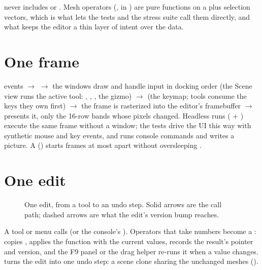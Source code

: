  never includes  or . Mesh operators (, in
) are pure functions on a  plus selection vectors, which is what lets the
tests and the stress suite call them directly, and what keeps the editor a thin layer of intent over the data.

\section{One frame}
 events $\to$  $\to$ the windows draw and handle input in docking order (the Scene
view runs the active tool: , , , the gizmo) $\to$
 (the keymap; tools consume the keys they own first) $\to$ the frame is rasterized into the
editor's framebuffer $\to$  presents it, only the 16-row bands whose pixels changed. Headless runs
( + ) execute the same frame without a window; the tests drive the UI this
way with synthetic mouse and key events, and  runs console commands and writes a
picture. A  () starts frames at most  apart without oversleeping
\cite{Gregory2018vol1}.

\section{One edit}
\begin{figure}[H]
  \centering
  \resizebox{\textwidth}{!}{}
  \caption{One edit, from a tool to an undo step. Solid arrows are the call path; dashed arrows are what the edit's version bump reaches.}
  \label{fig:edit}
\end{figure}

A tool or menu calls  (or the console's ). Operators that take numbers become a
:  copies , applies the  function with the current
values, records the result's pointer and version, and the F9 panel or the drag helper re-runs it when a value changes.
 turns the edit into one undo step: a scene clone sharing the unchanged meshes ().

